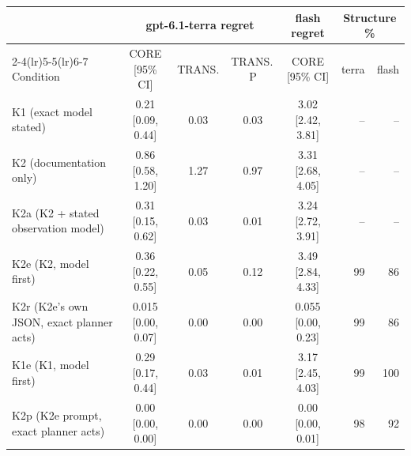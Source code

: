 \begin{tabular}{@{}lccccrr@{}}
\toprule
 & \multicolumn{3}{c}{gpt-6.1-terra regret} & flash regret & \multicolumn{2}{c}{Structure \%} \\
\cmidrule(lr){2-4}\cmidrule(lr){5-5}\cmidrule(lr){6-7}
Condition & CORE [95\% CI] & TRANS. & TRANS.\,P & CORE [95\% CI] & terra & flash \\
\midrule
K1 (exact model stated) & 0.21 [0.09, 0.44] & 0.03 & 0.03 & 3.02 [2.42, 3.81] & -- & -- \\
K2 (documentation only) & 0.86 [0.58, 1.20] & 1.27 & 0.97 & 3.31 [2.68, 4.05] & -- & -- \\
\addlinespace
K2a (K2 + stated observation model) & 0.31 [0.15, 0.62] & 0.03 & 0.01 & 3.24 [2.72, 3.91] & -- & -- \\
K2e (K2, model first) & 0.36 [0.22, 0.55] & 0.05 & 0.12 & 3.49 [2.84, 4.33] & 99 & 86 \\
K2r (K2e's own JSON, exact planner acts) & 0.015 [0.00, 0.07] & 0.00 & 0.00 & 0.055 [0.00, 0.23] & 99 & 86 \\
K1e (K1, model first) & 0.29 [0.17, 0.44] & 0.03 & 0.01 & 3.17 [2.45, 4.03] & 99 & 100 \\
K2p (K2e prompt, exact planner acts) & 0.00 [0.00, 0.00] & 0.00 & 0.00 & 0.00 [0.00, 0.01] & 98 & 92 \\
\bottomrule
\end{tabular}
